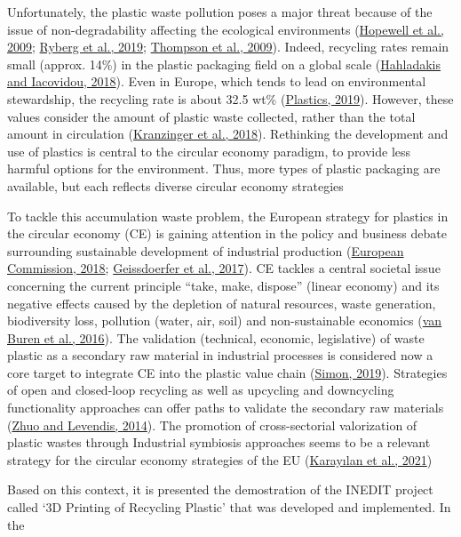 \documentclass[
  11pt,
]{article}
\begin{document}
Unfortunately, the plastic waste pollution poses a major threat because
of the issue of non-degradability affecting the ecological environments
(\protect\hyperlink{ref-Hopewell2009}{Hopewell et al., 2009};
\protect\hyperlink{ref-Ryberg2019}{Ryberg et al., 2019};
\protect\hyperlink{ref-Thompson2009b}{Thompson et al., 2009}). Indeed,
recycling rates remain small (approx. 14\%) in the plastic packaging
field on a global scale
(\protect\hyperlink{ref-Hahladakis2018}{Hahladakis and Iacovidou,
2018}). Even in Europe, which tends to lead on environmental
stewardship, the recycling rate is about 32.5 wt\%
(\protect\hyperlink{ref-Plastics2019}{Plastics, 2019}). However, these
values consider the amount of plastic waste collected, rather than the
total amount in circulation
(\protect\hyperlink{ref-Kranzinger2018}{Kranzinger et al., 2018}).
Rethinking the development and use of plastics is central to the
circular economy paradigm, to provide less harmful options for the
environment. Thus, more types of plastic packaging are available, but
each reflects diverse circular economy strategies

To tackle this accumulation waste problem, the European strategy for
plastics in the circular economy (CE) is gaining attention in the policy
and business debate surrounding sustainable development of industrial
production (\protect\hyperlink{ref-EC2018}{European Commission, 2018};
\protect\hyperlink{ref-Geissdoerfer2017}{Geissdoerfer et al., 2017}). CE
tackles a central societal issue concerning the current principle
``take, make, dispose'' (linear economy) and its negative effects caused
by the depletion of natural resources, waste generation, biodiversity
loss, pollution (water, air, soil) and non-sustainable economics
(\protect\hyperlink{ref-VanBuren2016}{van Buren et al., 2016}). The
validation (technical, economic, legislative) of waste plastic as a
secondary raw material in industrial processes is considered now a core
target to integrate CE into the plastic value chain
(\protect\hyperlink{ref-Simon2019}{Simon, 2019}). Strategies of open and
closed-loop recycling as well as upcycling and downcycling functionality
approaches can offer paths to validate the secondary raw materials
(\protect\hyperlink{ref-Zhuo2014}{Zhuo and Levendis, 2014}). The
promotion of cross-sectorial valorization of plastic wastes through
Industrial symbiosis approaches seems to be a relevant strategy for the
circular economy strategies of the EU
(\protect\hyperlink{ref-Karaylan2021}{Karayılan et al., 2021})

Based on this context, it is presented the demostration of the INEDIT
project called `3D Printing of Recycling Plastic' that was developed and
implemented. In the
\end{document}
